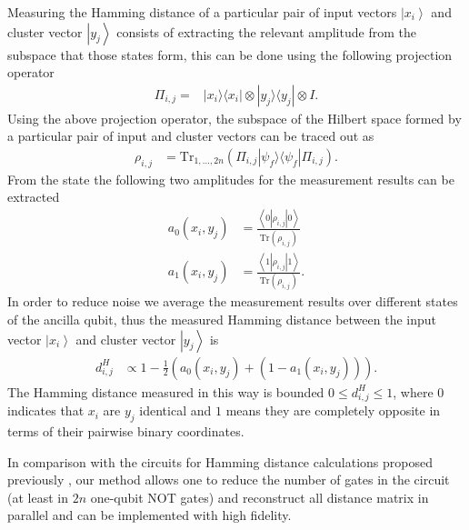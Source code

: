 \documentclass[pra,showkeys,twocolumn,showpacs]{revtex4-1}
\begin{document}
Measuring the Hamming distance of a particular pair of input vectors $\left| x_i \right\rangle$ and cluster vector $\left| y_j \right\rangle$ consists of extracting the relevant amplitude from the subspace that those states form, 
this can be done using the following projection operator
%
\begin{align}
\Pi_{i,j} = &\left| x_i \rangle\langle x_i \right| \otimes \left| y_j \rangle\langle y_j \right| \otimes I .
\end{align} 
%
Using the above projection operator, the subspace of the Hilbert space formed by a particular pair of input and cluster vectors can be traced out as
%
\begin{align}
    \rho_{i,j} &= \text{Tr}_{1,\dots,2n} (\Pi_{i,j} \left| \psi_f \rangle\langle \psi_f \right| \Pi_{i,j}) .
\end{align}
%
From the state the following two amplitudes for the measurement results can be extracted
%
\begin{align}
    a_0(x_i,y_j) & = \frac{\left\langle 0 |\rho_{i,j}| 0 \right\rangle}{\text{Tr}(\rho_{i,j})}  \\
    a_1(x_i,y_j) & = \frac{\left\langle 1 |\rho_{i,j}| 1 \right\rangle}{\text{Tr}(\rho_{i,j})} .
\end{align}
%
In order to reduce noise we average the measurement results over different states of the ancilla qubit, 
thus the measured Hamming distance between the input vector $\left| x_i \right\rangle$ and cluster vector $\left| y_j \right\rangle$ is
%
\begin{align}
    d_{i,j}^H & \propto 1 - \frac{1}{2}(a_0(x_i,y_j) + (1-a_1(x_i,y_j))) .
\end{align}
%
The Hamming distance measured in this way is bounded $0 \leq d_{i,j}^H \leq 1$, 
where  $0$ indicates that $x_i$ are $y_j$ identical and $1$ means they are completely opposite in terms of their pairwise binary coordinates.

In comparison with the circuits for Hamming distance calculations proposed previously \cite{trugenberger2001}, 
our method allows one to reduce the number of gates in the circuit (at least in $2n$ one-qubit NOT gates)
and reconstruct all distance matrix in parallel and can be implemented with high fidelity.  
\end{document}
